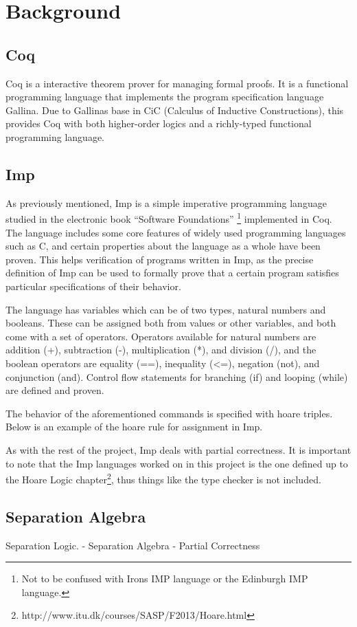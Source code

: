 \section{Background}
\subsection{Coq}
Coq is a interactive theorem prover for managing formal proofs. It is a functional programming language that implements the program specification language Gallina. Due to Gallinas base in CiC (Calculus of Inductive Constructions), this provides Coq with both higher-order logics and a richly-typed functional programming language.

\subsection{Imp}
As previously mentioned, Imp is a simple imperative programming language studied in the electronic book ``Software Foundations'' \footnote{Not to be confused with Irons IMP language or the Edinburgh IMP language.} implemented in Coq. The language includes some core features of widely used programming languages such as C, and certain properties about the language as a whole have been proven. This helps verification of programs written in Imp, as the precise definition of Imp can be used to formally prove that a certain program satisfies particular specifications of their behavior. 

The language has variables which can be of two types, natural numbers and booleans. These can be assigned both from values or other variables, and both come with a set of operators. Operators available for natural numbers are addition (+), subtraction (-), multiplication (*), and division (/), and the boolean operators are equality (==), inequality (<=), negation (not), and conjunction (and). Control flow statements for branching (if) and looping (while) are defined and proven.

The behavior of the aforementioned commands is specified with hoare triples. Below is an example of the hoare rule for assignment in Imp.

\begin{center}

\end{center}

As with the rest of the project, Imp deals with partial correctness. It is important to note that the Imp languages worked on in this project is the one defined up to the Hoare Logic chapter\footnote{http://www.itu.dk/courses/SASP/F2013/Hoare.html}, thus things like the type checker is not included.

\subsection{Separation Algebra}
Separation Logic.
 - Separation Algebra
 - Partial Correctness